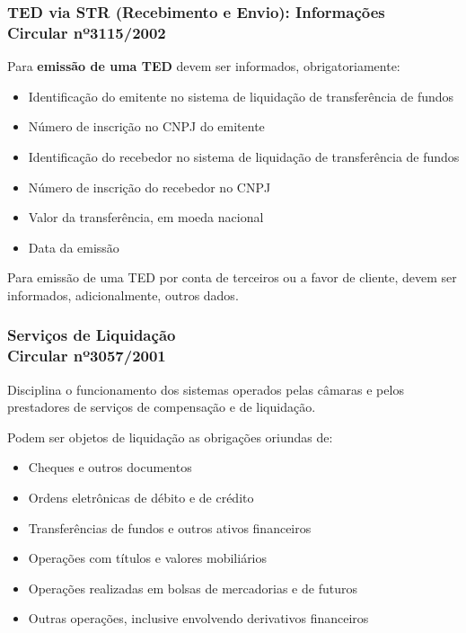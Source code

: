 \documentclass[10pt]{beamer}
\begin{document}
\begin{frame} 
\frametitle{TED via STR (Recebimento e Envio): Informações\\Circular nº3115/2002}

Para \textbf{emissão de uma TED} devem ser informados, obrigatoriamente: 
\begin{itemize}
	\item Identificação do emitente no sistema de liquidação de transferência de fundos
	\item Número de inscrição no CNPJ do emitente
	\item Identificação do recebedor no sistema de liquidação de transferência de fundos
	\item Número de inscrição do recebedor no CNPJ
	\item Valor da transferência, em moeda nacional
	\item Data da emissão
\end{itemize}

Para emissão de uma TED por conta de terceiros ou a favor de cliente, devem ser informados, adicionalmente, outros dados. 

\end{frame}

\begin{frame} 
\frametitle{Serviços de Liquidação\\Circular nº3057/2001}

Disciplina o funcionamento dos sistemas operados pelas câmaras e pelos prestadores de serviços de compensação e de liquidação.

Podem ser objetos de liquidação as obrigações oriundas de:
\begin{itemize}
	\item Cheques e outros documentos
	\item Ordens eletrônicas de débito e de crédito
	\item Transferências de fundos e outros ativos financeiros
	\item Operações com títulos e valores mobiliários
	\item Operações realizadas em bolsas de mercadorias e de futuros
	\item Outras operações, inclusive envolvendo derivativos financeiros
\end{itemize}

\end{frame}
\end{document}
